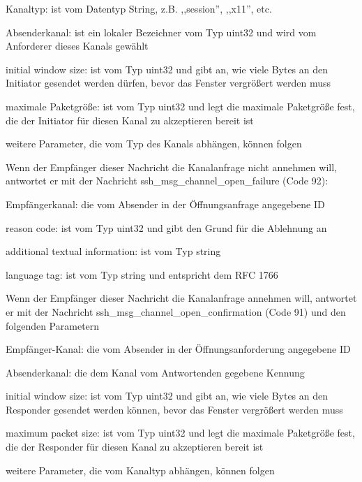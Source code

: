 \documentclass[a4paper]{article}
\begin{document}
\begin{multicols}{3}
\begin{itemize*}
\begin{itemize*}
\begin{itemize*}
                        \begin{itemize*} \item Kanaltyp: ist vom Datentyp String, z.B. ,,session'', ,,x11'', etc. \item Absenderkanal: ist ein lokaler Bezeichner vom Typ uint32 und wird vom Anforderer dieses Kanals gewählt \item initial window size: ist vom Typ uint32 und gibt an, wie viele Bytes an den Initiator gesendet werden dürfen, bevor das Fenster vergrößert werden muss \item maximale Paketgröße: ist vom Typ uint32 und legt die maximale Paketgröße fest, die der Initiator für diesen Kanal zu akzeptieren bereit ist \item weitere Parameter, die vom Typ des Kanals abhängen, können folgen \end{itemize*}
                        \item Wenn der Empfänger dieser Nachricht die Kanalanfrage nicht annehmen will, antwortet er mit der Nachricht ssh\_msg\_channel\_open\_failure (Code 92):
                        \begin{itemize*} \item Empfängerkanal: die vom Absender in der Öffnungsanfrage angegebene ID \item reason code: ist vom Typ uint32 und gibt den Grund für die Ablehnung an \item additional textual information: ist vom Typ string \item language tag: ist vom Typ string und entspricht dem RFC 1766 \end{itemize*}
                        \item Wenn der Empfänger dieser Nachricht die Kanalanfrage annehmen will, antwortet er mit der Nachricht ssh\_msg\_channel\_open\_confirmation (Code 91) und den folgenden Parametern
                        \begin{itemize*} \item Empfänger-Kanal: die vom Absender in der Öffnungsanforderung angegebene ID \item Absenderkanal: die dem Kanal vom Antwortenden gegebene Kennung \item initial window size: ist vom Typ uint32 und gibt an, wie viele Bytes an den Responder gesendet werden können, bevor das Fenster vergrößert werden muss \item maximum packet size: ist vom Typ uint32 und legt die maximale Paketgröße fest, die der Responder für diesen Kanal zu akzeptieren bereit ist \item weitere Parameter, die vom Kanaltyp abhängen, können folgen \end{itemize*}

\end{itemize*}
\end{itemize*}
\end{itemize*}
\end{multicols}
\end{document}

